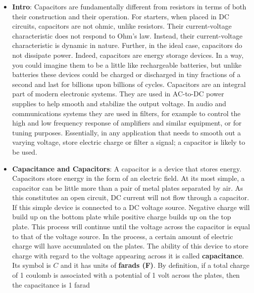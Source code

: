 \documentclass{report}
\begin{document}
    \pagebreak 
    \begin{itemize}
        \item \textbf{Intro}: Capacitors are fundamentally different from resistors in terms of both their construction and their operation. For starters, when placed in DC circuits, capacitors are not ohmic, unlike resistors. Their current-voltage characteristic does not respond to Ohm's law. Instead, their current-voltage characteristic is dynamic in nature. Further, in the ideal case, capacitors do not dissipate power. Indeed, capacitors are energy storage devices. In a way, you could imagine them to be a little like rechargeable batteries, but unlike batteries these devices could be charged or discharged in tiny fractions of a second and last for billions upon billions of cycles.         
            \bigbreak \noindent 
            Capacitors are an integral part of modern electronic systems. They are used in AC-to-DC power supplies to help smooth and stabilize the output voltage. In audio and communications systems they are used in filters, for example to control the high and low frequency response of amplifiers and similar equipment, or for tuning purposes. Essentially, in any application that needs to smooth out a varying voltage, store electric charge or filter a signal; a capacitor is likely to be used.
        \item \textbf{Capacitance and Capacitors}: A capacitor is a device that stores energy. Capacitors store energy in the form of an electric field. At its most simple, a capacitor can be little more than a pair of metal plates separated by air. As this constitutes an open circuit, DC current will not flow through a capacitor. If this simple device is connected to a DC voltage source. Negative charge will build up on the bottom plate while positive charge builds up on the top plate. This process will continue until the voltage across the capacitor is equal to that of the voltage source. In the process, a certain amount of electric charge will have accumulated on the plates.
            \bigbreak \noindent 
            \bigbreak \noindent 
            The ability of this device to store charge with regard to the voltage appearing across it is called \textbf{capacitance}. Its symbol is $C$ and it has units of \textbf{farads (F)}.
            \bigbreak \noindent 
            By definition, if a total charge of 1 coulomb is associated with a potential of 1 volt across the plates, then the capacitance is 1 farad
            \begin{align*}

\end{align*}
\end{itemize}
\end{document}

